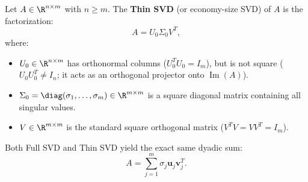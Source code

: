 \begin{definition}
\label{def:thin-svd-en}
Let $A \in \R^{n \times m}$ with $n \ge m$. The \textbf{Thin SVD} (or economy-size SVD) of $A$ is the factorization:
\begin{equation}
    A = U_0 \Sigma_0 V^T,
\end{equation}
where:
\begin{itemize}
    \item $U_0 \in \R^{n \times m}$ has orthonormal columns ($U_0^T U_0 = I_m$), but is not square ($U_0 U_0^T \neq I_n$; it acts as an orthogonal projector onto $\operatorname{Im}(A)$).
    \item $\Sigma_0 = \diag(\sigma_1, \dots, \sigma_m) \in \R^{m \times m}$ is a square diagonal matrix containing all singular values.
    \item $V \in \R^{m \times m}$ is the standard square orthogonal matrix ($V^T V = V V^T = I_m$).
\end{itemize}
\end{definition}

Both Full SVD and Thin SVD yield the exact same dyadic sum:
\begin{equation}
    A = \sum_{j=1}^m \sigma_j \mathbf{u}_j \mathbf{v}_j^T.
\end{equation}

